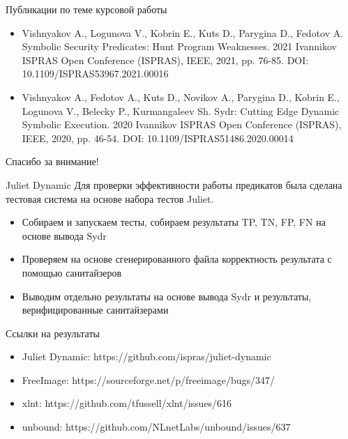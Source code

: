 \documentclass[10pt]{beamer}
\begin{document}
\begin{frame}{Публикации по теме курсовой работы}
    \begin{itemize}
        \item Vishnyakov A., Logunova V., Kobrin E., Kuts D., Parygina D., Fedotov A. Symbolic Security Predicates: Hunt Program Weaknesses. 2021 Ivannikov ISPRAS Open Conference (ISPRAS), IEEE, 2021, pp. 76-85. DOI: 10.1109/ISPRAS53967.2021.00016
        \item Vishnyakov A., Fedotov A., Kuts D., Novikov A., Parygina D., Kobrin E., Logunova V., Belecky P., Kurmangaleev Sh. Sydr: Cutting Edge Dynamic Symbolic Execution. 2020 Ivannikov ISPRAS Open Conference (ISPRAS), IEEE, 2020, pp. 46-54. DOI: 10.1109/ISPRAS51486.2020.00014
    \end{itemize}
\end{frame}

\begin{frame}[standout] \vfill Спасибо за внимание! \vfill \end{frame}

\begin{frame}{Juliet Dynamic}
Для проверки эффективности работы предикатов была сделана тестовая система на
основе набора тестов Juliet.
\begin{itemize}
    \item Собираем и запускаем тесты, собираем результаты TP, TN, FP, FN на
        основе вывода Sydr
    \item Проверяем на основе сгенерированного файла корректность результата с
        помощью санитайзеров
    \item Выводим отдельно результаты на основе вывода Sydr и результаты,
        верифицированные санитайзерами
\end{itemize}
\end{frame}

\begin{frame}{Ссылки на результаты}
\begin{itemize}
    \item Juliet Dynamic: https://github.com/ispras/juliet-dynamic
    \item FreeImage: https://sourceforge.net/p/freeimage/bugs/347/
    \item xlnt: https://github.com/tfussell/xlnt/issues/616
    \item unbound: https://github.com/NLnetLabs/unbound/issues/637
\end{itemize}
\end{frame}
\end{document}
